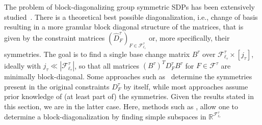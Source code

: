 \documentclass[a4paper,11pt]{article}
\numberwithin{equation}{section}
\newcommand{\mF}{\mathcal{F}}
\begin{document}
The problem of block-diagonalizing group symmetric SDPs has been extensively studied~\cite{Babai_1989,BachocEtAl_2012,Murota_2010,gatermann2004symmetry}. There is a theoretical best possible diagonalization, i.e., change of basis resulting in a more granular block diagonal structure of the matrices, that is given by the constraint matrices $(\hat D_F^\tau)_{F\in\mF^\tau_{\ell_\tau}}$ or, more specifically, their symmetries. The goal is to find a single base change matrix $B^\tau$ over $\mF^\tau_{\ell_\tau}\times [j_\tau]$, ideally with $j_\tau\ll |\mF^\tau_{\ell_\tau}|$, so that all matrices $(B^\tau)^T D_F^\tau B^\tau$ for $F\in\mF^\tau$ are minimally block-diagonal. Some approaches such as~\cite{Murota_2010} determine the symmetries present in the original constraints $D^\tau_F$ by itself, while most approaches assume prior knowledge of (at least part of) the symmetries. Given the results stated in this section, we are in the latter case. Here, methods such as \cite{Babai_1989}, allow one to determine a block-diagonalization by finding simple subspaces in $\mathbb R^{\mF^\tau_{\ell_\tau}}$
\end{document}

